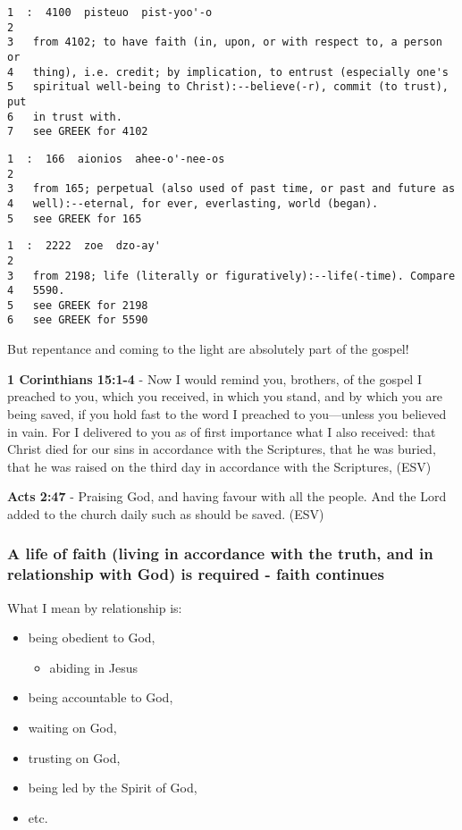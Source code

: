 \documentclass[11pt]{article}
\begin{document}
\begin{verbatim}
1  :  4100  pisteuo  pist-yoo'-o
2  
3   from 4102; to have faith (in, upon, or with respect to, a person or
4   thing), i.e. credit; by implication, to entrust (especially one's
5   spiritual well-being to Christ):--believe(-r), commit (to trust), put
6   in trust with.
7   see GREEK for 4102
\end{verbatim}

\begin{verbatim}
1  :  166  aionios  ahee-o'-nee-os
2  
3   from 165; perpetual (also used of past time, or past and future as
4   well):--eternal, for ever, everlasting, world (began).
5   see GREEK for 165
\end{verbatim}

\begin{verbatim}
1  :  2222  zoe  dzo-ay'
2  
3   from 2198; life (literally or figuratively):--life(-time). Compare
4   5590.
5   see GREEK for 2198
6   see GREEK for 5590
\end{verbatim}

But repentance and coming to the light are absolutely part of the gospel!

\textbf{1 Corinthians 15:1-4} -  Now I would remind you, brothers, of the gospel I preached to you, which you received, in which you stand, and by which you are being saved, if you hold fast to the word I preached to you—unless you believed in vain.  For I delivered to you as of first importance what I also received: that Christ died for our sins in accordance with the Scriptures, that he was buried, that he was raised on the third day in accordance with the Scriptures,  (ESV)

\textbf{Acts 2:47} - Praising God, and having favour with all the people. And the Lord added to the church daily such as should be saved. (ESV)

\subsubsection{A life of faith (living in accordance with the truth, and in relationship with God) is required - faith continues}
\label{sec:orgc4cf365}
What I mean by relationship is:
\begin{itemize}
\item being obedient to God,
\begin{itemize}
\item abiding in Jesus
\end{itemize}
\item being accountable to God,
\item waiting on God,
\item trusting on God,
\item being led by the Spirit of God,
\item etc.
\end{itemize}
\end{document}
